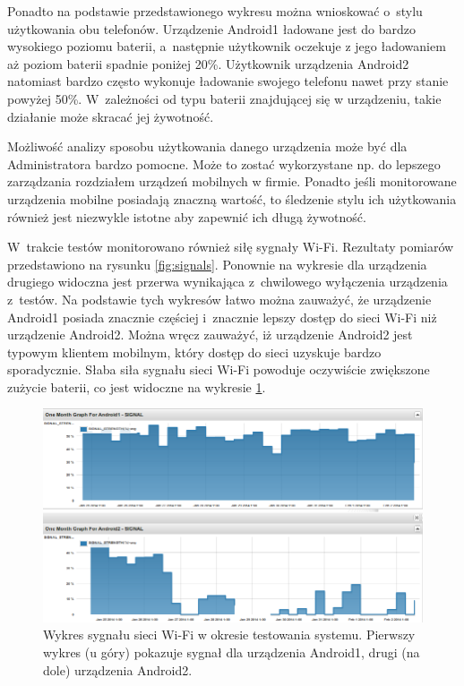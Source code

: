 Ponadto na podstawie przedstawionego wykresu można wnioskować o~stylu
użytkowania obu telefonów. Urządzenie Android1 ładowane jest do bardzo
wysokiego poziomu baterii, a~następnie użytkownik oczekuje z jego
ładowaniem aż poziom baterii spadnie poniżej 20\%. Użytkownik
urządzenia Android2 natomiast bardzo często wykonuje ładowanie swojego
telefonu nawet przy stanie powyżej 50\%. W~zależności od typu baterii
znajdującej się w urządzeniu, takie działanie może skracać jej
żywotność.

Możliwość analizy sposobu użytkowania danego urządzenia może być dla
Administratora bardzo pomocne. Może to zostać wykorzystane np. do
lepszego zarządzania rozdziałem urządzeń mobilnych w firmie. Ponadto
jeśli monitorowane urządzenia mobilne posiadają znaczną wartość, to
śledzenie stylu ich użytkowania również jest niezwykle istotne aby
zapewnić ich długą żywotność.

W~trakcie testów monitorowano również siłę sygnały Wi-Fi. Rezultaty
pomiarów przedstawiono na rysunku \ref{fig:signals}. Ponownie na
wykresie dla urządzenia drugiego widoczna jest przerwa wynikająca
z~chwilowego wyłączenia urządzenia z~testów. Na podstawie tych
wykresów łatwo można zauważyć, że urządzenie Android1 posiada znacznie
częściej i~znacznie lepszy dostęp do sieci Wi-Fi niż urządzenie
Android2. Można wręcz zauważyć, iż urządzenie Android2 jest typowym
klientem mobilnym, który dostęp do sieci uzyskuje bardzo
sporadycznie. Słaba siła sygnału sieci Wi-Fi powoduje oczywiście
zwiększone zużycie baterii, co jest widoczne na wykresie
\ref{fig:baterie}.

\begin{figure}[ht]
  \caption{Wykres sygnału sieci Wi-Fi w okresie testowania
    systemu. Pierwszy wykres (u góry) pokazuje sygnał dla urządzenia
    Android1, drugi (na dole) urządzenia Android2.}
  \label{fig:baterie}
  \centering
\includegraphics[width=1\textwidth]{img/wifi.png}
\end{figure}

